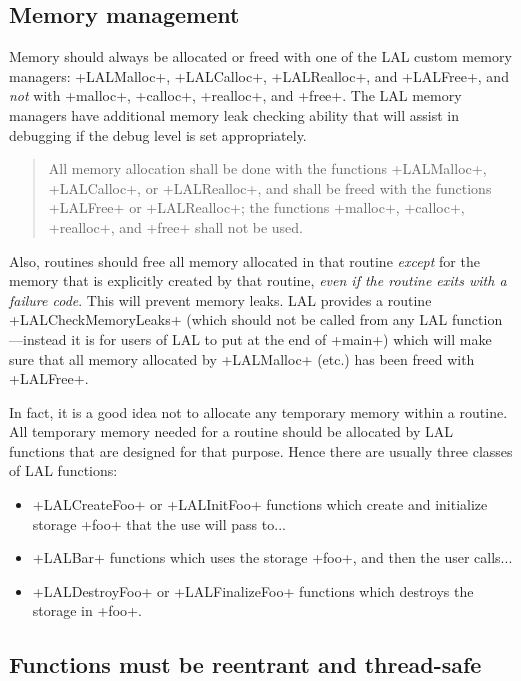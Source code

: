 \documentclass[10pt]{ligodcc}
\makeatletter
\def\verb{\relax\ifmmode\hbox\else\leavevmode\null\fi
  \bgroup
    \color{blue}\small
    \verb@eol@error \let\do\@makeother \dospecials
    \verbatim@font\@noligs
    \@ifstar\@sverb\@verb}
\newlength{\fminilength}
\newenvironment{fminipage}[1][\linewidth]
  {\setlength{\fminilength}{#1-2\fboxsep-2\fboxrule}%
   \begin{lrbox}{\fminibox}\begin{minipage}{\fminilength}}
  {\end{minipage}\end{lrbox}\noindent\fbox{\usebox{\fminibox}}}
\newenvironment{lalrule}{\begin{quote}\color{red}\begin{fminipage}}
  {\end{fminipage}\end{quote}}
\makeatother
\begin{document}
\subsection{Memory management}

Memory should always be allocated or freed with one of the LAL custom
memory managers: \verb+LALMalloc+, \verb+LALCalloc+, \verb+LALRealloc+, 
and \verb+LALFree+, and \emph{not} with \verb+malloc+, \verb+calloc+,
\verb+realloc+, and \verb+free+.  The LAL memory managers have additional
memory leak checking ability that will assist in debugging if the debug
level is set appropriately.

\begin{lalrule}
All memory allocation shall be done with the functions \verb+LALMalloc+,
\verb+LALCalloc+, or \verb+LALRealloc+, and shall be freed with the functions
\verb+LALFree+ or \verb+LALRealloc+; the functions \verb+malloc+,
\verb+calloc+, \verb+realloc+, and \verb+free+ shall not be used.
\end{lalrule}

Also, routines should free all memory allocated in that routine \emph{except}
for the memory that is explicitly created by that routine, \emph{even if the
routine exits with a failure code}.  This will prevent memory leaks.  LAL
provides a routine \verb+LALCheckMemoryLeaks+ (which should not be called from
any LAL function---instead it is for users of LAL to put at the end of
\verb+main+) which will make sure that all memory allocated by \verb+LALMalloc+
(etc.) has been freed with \verb+LALFree+.

In fact, it is a good idea not to allocate any temporary memory within a
routine.  All temporary memory needed for a routine should be allocated by LAL
functions that are designed for that purpose.  Hence there are usually
three classes of LAL functions:
\begin{itemize}
\item \verb+LALCreateFoo+ or \verb+LALInitFoo+ functions which create and
initialize storage \verb+foo+ that the use will pass to...
\item \verb+LALBar+ functions which uses the storage \verb+foo+, and then
the user calls...
\item \verb+LALDestroyFoo+ or \verb+LALFinalizeFoo+ functions which destroys
the storage in \verb+foo+.
\end{itemize}


\subsection{Functions must be reentrant and thread-safe}
\end{document}
